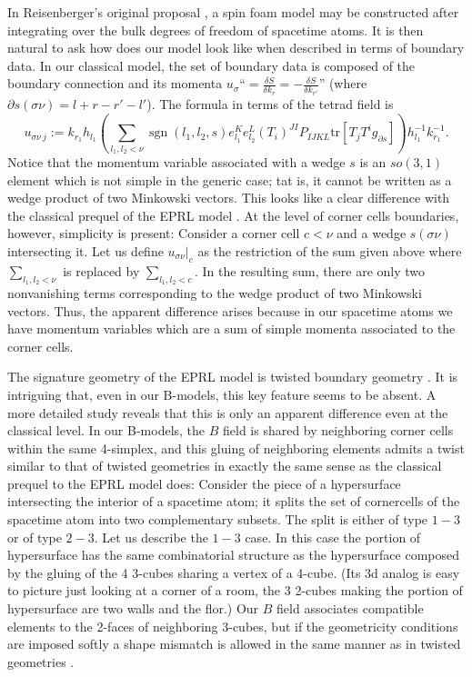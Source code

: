 \documentclass{article}
\DeclareMathOperator{\sgn}{sgn}
\begin{document}
In Reisenberger's original proposal \cite{Rei2}, a spin foam model may be constructed after integrating over the bulk degrees of freedom of spacetime atoms. It is then natural to ask how does our model look like when described in terms of boundary data. 
In our classical model, the set of boundary data is composed of the boundary connection and its momenta 
$u_\sigma$``$= \frac{\delta S}{\delta k_r} = - \frac{\delta S}{\delta k_{r'}}$'' 
(where $\partial s(\sigma \nu) = l + r - r' - l'$). The formula in terms of the tetrad field is 
\[
u_{\sigma\nu~j}:=k_{r_1}h_{l_1} \left(
\sum_{l_1, l_2 <\nu}\sgn(l_1, l_2, s)e_{l_1}^{K}e_{l_2}^{L}\left(T_{i}\right)^{JI}P_{IJKL}\text{tr}\left[T_{j}T^{i}g_{\partial s}\right]
\right) h_{l_1}^{-1}k_{r_1}^{-1} . 
\]
Notice that the momentum variable associated with a wedge $s$ is an $so(3,1)$ element which is not simple in the generic case; tat is,  it cannot be written as a wedge product of two Minkowski vectors. This looks like a clear difference with the classical prequel of the EPRL model \cite{EPRL}. At the level of corner cells boundaries, however, simplicity is present: 
Consider a corner cell $c<\nu$ and a wedge $s(\sigma \nu)$ intersecting it. 
Let us define $u_{\sigma \nu}|_c$ as the restriction of the sum given above where 
$\sum_{l_1, l_2 <\nu}$ is replaced by $\sum_{l_1, l_2 < c}$. In the resulting sum, there are only two nonvanishing terms corresponding to the wedge product of two Minkowski vectors. 
Thus, the apparent difference arises because in our spacetime atoms we have momentum variables which are a sum of simple momenta associated to the corner cells. 


The signature geometry of the EPRL model is twisted boundary geometry \cite{FS}. It is intriguing that, even in our B-models, this key feature seems to be absent. A more detailed study reveals that this is only an apparent difference even at the classical level. 
In our B-models, the $B$ field is shared by neighboring corner cells within the same 4-simplex, and this gluing of neighboring elements admits a twist similar to that of twisted geometries in exactly the same sense as the classical prequel to the EPRL model does: 
Consider the piece of a hypersurface intersecting the interior of a spacetime atom; it splits the set of cornercells of the spacetime atom into two complementary subsets. The split is either of type $1-3$ or of type $2-3$. Let us describe the $1-3$ case. In this case the portion of hypersurface has the same combinatorial structure as the hypersurface composed by the gluing of the 4 3-cubes sharing a vertex of a 4-cube. (Its 3d analog is easy to picture just looking at a corner of a room, the 3 2-cubes making the portion of hypersurface are two walls and the flor.) Our $B$ field associates compatible elements to the 2-faces of neighboring 3-cubes, but if the geometricity conditions are imposed softly a shape mismatch is allowed in the same manner as in twisted geometries \cite{FS}. 
\end{document}
